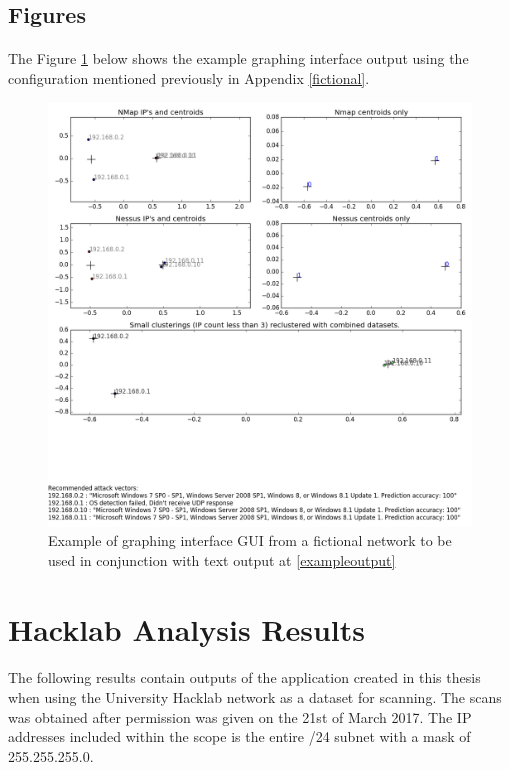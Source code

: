 \subsection{Figures}
\label{example_dual}

\paragraph{}The Figure \ref{example_twin} below shows the example graphing interface output using the configuration mentioned previously in Appendix \ref{fictional}.

\begin{figure}[!h]
\centering
\includegraphics[width=6in]{./Figures/example_dual.png}
\caption{Example of graphing interface GUI from a fictional network to be used in conjunction with text output at \ref{exampleoutput}}
\label{example_twin}
\end{figure}


\section{Hacklab Analysis Results}
\label{hacklab}

\paragraph{}The following results contain outputs of the application created in this thesis when using the University Hacklab network as a dataset for scanning. The scans was obtained after permission was given on the 21st of March 2017. The IP addresses included within the scope is the entire /24 subnet with a mask of 255.255.255.0.

